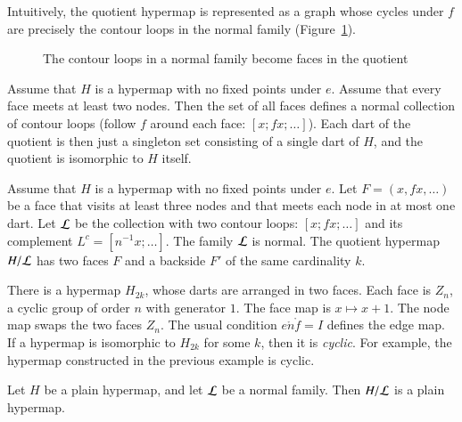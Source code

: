 Intuitively, the quotient hypermap is represented as a graph whose cycles under $f$ are precisely the contour loops in the normal family (Figure~\ref{fig:quot}).


\begin{figure}[htb]
  \centering
  \caption{The contour loops in a normal family become faces in the quotient}
  \label{fig:quot}
\end{figure}


\begin{example}\label{ex:Hall} 
Assume that $H$ is a hypermap with no fixed points under $e$. Assume that every face meets at least two nodes. Then the set of all faces defines a normal collection of contour loops (follow $f$ around each face: $[x;f x;\ldots]$).  Each dart of the quotient is then just a singleton set consisting of a single dart of $H$, and the quotient is isomorphic to $H$ itself.
\end{example}

\begin{example}\label{ex:H2} 
Assume that $H$ is a hypermap with no fixed points
under $e$.  Let $F = (x,f x,\ldots)$ be a face 
that visits at least
three nodes and that meets each node in at most one dart.
Let $\cal L$ be the
collection with two contour loops:  $[x;f x;\ldots]$ and its
complement $L^c = [n^{-1} x;\ldots]$.
The family $\cal L$ is normal. The quotient hypermap $H/{\cal L}$ has two faces $F$ and a backside $F'$ of the same cardinality $k$.
\end{example}





\begin{example}[cyclic]\label{ex:H2k} 
There is a hypermap $H_{2k}$, whose darts are arranged in two faces.  Each
face is $Z_n$, a cyclic group of order $n$ with generator $1$.
The face map is $x\mapsto x+1$.
The node map swaps the two faces $Z_n$.
The usual condition $e\ocirc n\ocirc f = I$ defines the edge map.
If a hypermap is isomorphic to $H_{2k}$ for
some $k$, then it is {\it cyclic}.  For example,
the hypermap constructed in the previous example is cyclic.
\end{example}

\begin{lemma}
Let $H$ be a plain hypermap, and let $\cal L$ be a
normal family.  Then $H/{\cal L}$ is a plain hypermap.
\end{lemma}

